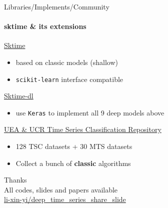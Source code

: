 \documentclass[aspectratio=169]{ctexbeamer}
\begin{document}
\begin{frame}{Libraries/Implements/Community}
  \framesubtitle{sktime \& its extensions}
  \href{https://github.com/alan-turing-institute/sktime}{\Large{Sktime}}
  \begin{itemize}
    \item based on classic models (shallow)
    \item \texttt{scikit-learn} interface compatible
  \end{itemize}
  \href{https://github.com/sktime/sktime-dl}{\Large{Sktime-dl}}
  \begin{itemize}
    \item use \texttt{Keras} to implement all 9 deep models above
  \end{itemize}
  \href{http://www.timeseriesclassification.com/}{\Large{UEA \& UCR Time Series Classification Repository}}
  \begin{itemize}
    \item 128 TSC datasets + 30 MTS datasets
    \item Collect a bunch of \textbf{classic} algorithms
  \end{itemize}
\end{frame}

\begin{frame}{}
  \begin{center}
  {\Huge{Thanks}} \\
  All codes, slides and papers available\\
  \faGithub \href{https://github.com/li-xin-yi/deep_time_series_share_slide}{li-xin-yi/deep\_time\_series\_share\_slide}
\end{center}
\end{frame}
\end{document}
